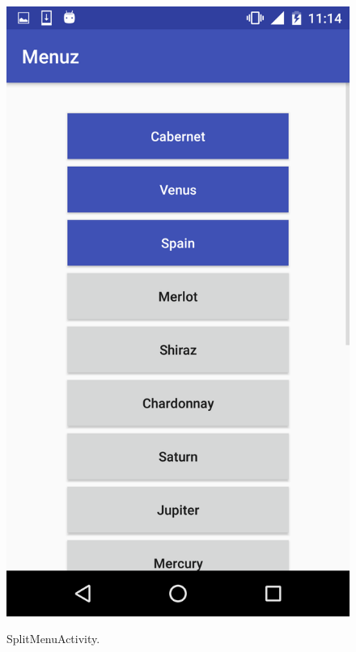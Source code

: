 \begin{figure}[!ht]
  \begin{center}
    \includegraphics[scale=0.22]{img/split_menu.png}
    \label{fig:split_menu}
    \caption{SplitMenuActivity.}
  \end{center}
\end{figure}

\newpage

